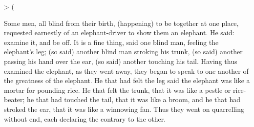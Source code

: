 {    >   
        
     {\RMF(}   
        
   \par}

\ornline{\Sine}

Some men, all blind from their birth, (happening) to be together at one place, requested
earnestly of an elephant-driver to show them an elephant. He said: examine it, and be off.
It is a fine thing, said one blind man, feeling the elephant's leg; (so said) another blind
man stroking his trunk, (so said) another passing his hand over the ear, (so said) another
touching his tail. Having thus examined the elephant, as they went away, they began to
speak to one another of the greatness of the elephant. He that had felt the leg said the
elephant was like a mortar for pounding rice. He that felt the trunk, that it was like
a pestle or rice-beater; he that had touched the tail, that it was like a broom, and he that
had stroked the ear, that it was like a winnowing fan. Thus they went on quarrelling
without end, each declaring the contrary to the other.

\ornline{\Orn}

\bye
